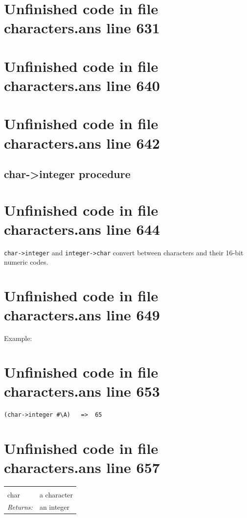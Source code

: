 \documentclass[twoside,9pt]{report}
\begin{document}
\section{Unfinished code in file characters.ans line 631}
\section{Unfinished code in file characters.ans line 640}
\section{Unfinished code in file characters.ans line 642}
\subsection{char->integer procedure}
\label{char->integer-procedure}
\section{Unfinished code in file characters.ans line 644}


\texttt{char->integer} and \texttt{integer->char} convert between characters and their 16-bit numeric codes.

\section{Unfinished code in file characters.ans line 649}


Example:

\section{Unfinished code in file characters.ans line 653}
\begin{verbatim}
(char->integer #\A)   =>  65
\end{verbatim}
\section{Unfinished code in file characters.ans line 657}
\noindent\begin{tabular}{ |p{1.9cm} p{8cm}| }
\hline
\rowcolor[HTML]{CCCCCC} \multicolumn{2}{|l|}{\bf char->integer (public)} \\
char & a character \\
\textit{Returns:} & an integer \\
\hline
\end{tabular}
\end{document}
